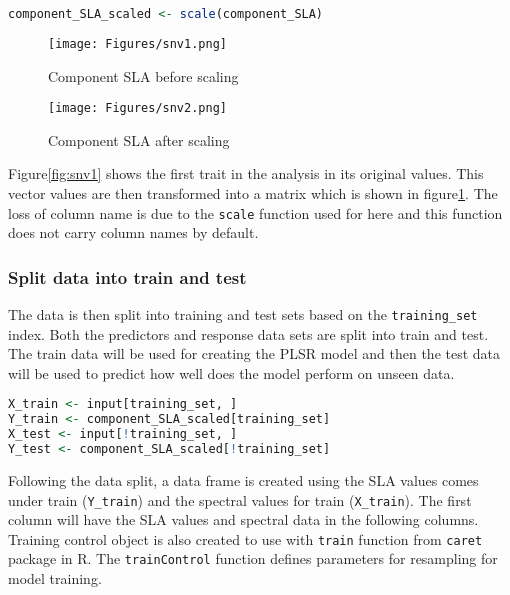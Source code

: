 \documentclass[12pt,a4paper]{report}
\begin{document}
\begin{lstlisting}[language=R, style=mystyle]
component_SLA_scaled <- scale(component_SLA)
\end{lstlisting}

\begin{figure}[h]
    \centering
    \begin{minipage}{0.45\textwidth}
        \centering
        \texttt{[image: Figures/snv1.png]} 
        \caption{Component SLA before scaling}
        \label{fig:snv1}
    \end{minipage}
    \hfill
    \begin{minipage}{0.45\textwidth}
        \centering
        \texttt{[image: Figures/snv2.png]} 
        \caption{Component SLA after scaling}
        \label{fig:snv2}
    \end{minipage}
\end{figure}

Figure\ref{fig:snv1} shows the first trait in the analysis in its original values. This vector values are then transformed into a matrix which is shown in figure\ref{fig:snv2}. The loss of column name is due to the \texttt{scale} function used for here and this function does not carry column names by default. \\

\subsubsection*{Split data into train and test}
The data is then split into training and test sets based on the \texttt{training\_set} index. Both the predictors and response data sets are split into train and test. The train data will be used for creating the PLSR model and then the test data will be used to predict how well does the model perform on unseen data. \\

\begin{lstlisting}[language=R, style=mystyle]
X_train <- input[training_set, ]
Y_train <- component_SLA_scaled[training_set]
X_test <- input[!training_set, ]
Y_test <- component_SLA_scaled[!training_set]
\end{lstlisting}

Following the data split, a data frame is created using the SLA values comes under train (\texttt{Y\_train}) and the spectral values for train (\texttt{X\_train}). The first column will have the SLA values and spectral data in the following columns. Training control object is also created to use with \texttt{train} function from \texttt{caret} package in R. The \texttt{trainControl} function defines parameters for resampling for model training. \\
\end{document}

